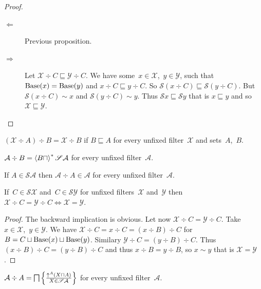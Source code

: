\begin{proof}
~
\begin{description}
\item[$\Leftarrow$] Previous proposition.

\item[$\Rightarrow$] Let
$\mathcal{X}\div C\sqsubseteq\mathcal{Y}\div C$.
We have some~$x\in\mathcal{X}$,~$y\in\mathcal{Y}$,
such that $\operatorname{Base}(x)=\operatorname{Base}(y)$ and
$x\div C\sqsubseteq y\div C$.
So $\mathscr{S}(x\div C)\sqsubseteq\mathscr{S}(y\div C)$.
But $\mathscr{S}(x\div C)\sim x$ and
$\mathscr{S}(y\div C)\sim y$. Thus
$\mathscr{S}x\sqsubseteq\mathscr{S}y$ that is
$x\sqsubseteq y$ and so
$\mathcal{X}\sqsubseteq\mathcal{Y}$.
\end{description}
\end{proof}

\begin{obvious}
$(\mathcal{X}\div A)\div B = \mathcal{X}\div B$ if
$B\sqsubseteq A$ for every unfixed filter~$\mathcal{X}$ and
sets~$A$,~$B$.
\end{obvious}

\begin{obvious}
$\mathcal{A}\div B = \left\langle B\sqcap\right\rangle ^{\ast}\mathscr{S}\mathcal{A}$
for every unfixed filter~$\mathcal{A}$.
\end{obvious}

\begin{obvious}
If $A\in\mathscr{S}\mathcal{A}$ then
$\mathcal{A}\div A\in\mathcal{A}$ for every unfixed
filter~$\mathcal{A}$.
\end{obvious}

\begin{prop}
If~$C\in\mathscr{S}\mathcal{X}$
and~$C\in\mathscr{S}\mathcal{Y}$ for unfixed
filters~$\mathcal{X}$ and~$\mathcal{Y}$ then
$\mathcal{X}\div C=\mathcal{Y}\div C \Leftrightarrow
\mathcal{X}=\mathcal{Y}$.
\end{prop}

\begin{proof}
The backward implication is obvious. Let now
$\mathcal{X}\div C=\mathcal{Y}\div C$.
Take~$x\in\mathcal{X}$,~$y\in\mathcal{Y}$.
We have
$\mathcal{X}\div C=x\div C=(x\div B)\div C$
for $B=C\sqcup\operatorname{Base}(x)\sqcup\operatorname{Base}(y)$.
Similary $\mathcal{Y}\div C=(y\div B)\div C$.
Thus $(x\div B)\div C=(y\div B)\div C$ and thus
$x\div B=y\div B$, so $x\sim y$ that is
$\mathcal{X}=\mathcal{Y}$.
\end{proof}

\begin{prop}
$\mathcal{A}\div A =
\bigsqcap\left\{ \frac{\uparrow^A(X\sqcap A)}{X\in\mathscr{S}\mathcal{A}}\right\}$ for every unfixed filter~$\mathcal{A}$.
\end{prop}

